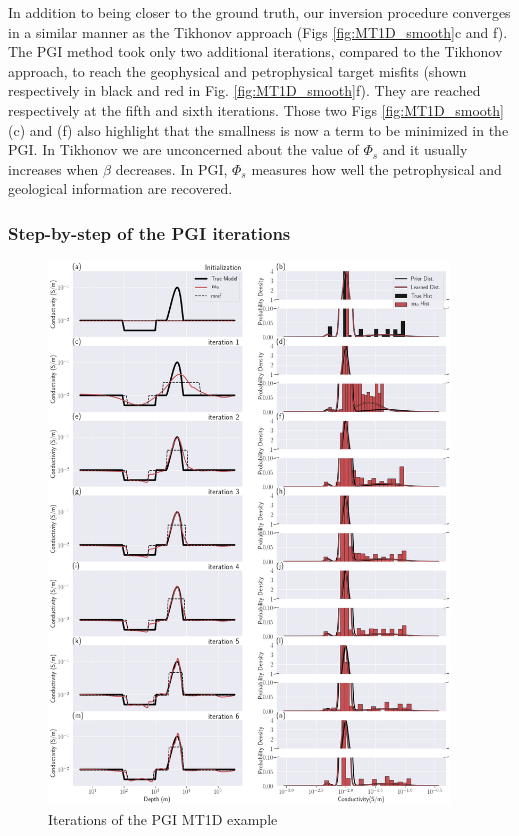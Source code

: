 \documentclass[extra]{gji} %
\begin{document}
In addition to being closer to the ground truth, our inversion procedure converges in a similar manner as the Tikhonov approach (Figs \ref{fig:MT1D_smooth}c and f). The PGI method took only two additional iterations, compared to the Tikhonov approach, to reach the geophysical and petrophysical target misfits (shown respectively in black and red in Fig. \ref{fig:MT1D_smooth}f). They are reached respectively at the fifth and sixth iterations. Those two Figs \ref{fig:MT1D_smooth}(c) and (f) also highlight that the smallness is now a term to be minimized in the PGI. In Tikhonov we are unconcerned about the value of $\Phi_s$ and it usually increases when $\beta$ decreases. In PGI, $\Phi_s$ measures how well the petrophysical and geological information are recovered.

\subsubsection{Step-by-step of the PGI iterations}

\begin{figure}
\centering
\includegraphics[width=0.95\textwidth]{Fig/LowRes/MT1D_Iterations.png}
\caption[]{Iterations of the PGI MT1D example}
\label{fig:MT1D_Iterations}
\end{figure}
\end{document}
